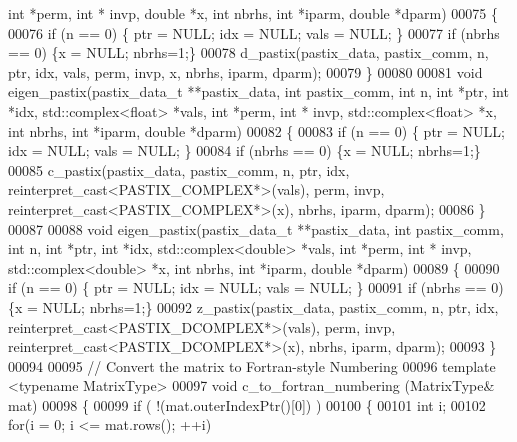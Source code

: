 \begin{DoxyCode}
{      int} *perm, \textcolor{keywordtype}{int} * invp, \textcolor{keywordtype}{double} *x, \textcolor{keywordtype}{int} nbrhs, \textcolor{keywordtype}{int} *iparm, \textcolor{keywordtype}{double} *dparm)
00075   \{
00076     \textcolor{keywordflow}{if} (n == 0) \{ ptr = NULL; idx = NULL; vals = NULL; \}
00077     \textcolor{keywordflow}{if} (nbrhs == 0) \{x = NULL; nbrhs=1;\}
00078     d\_pastix(pastix\_data, pastix\_comm, n, ptr, idx, vals, perm, invp, x, nbrhs, iparm, dparm); 
00079   \}
00080   
00081   \textcolor{keywordtype}{void} eigen\_pastix(pastix\_data\_t **pastix\_data, \textcolor{keywordtype}{int} pastix\_comm, \textcolor{keywordtype}{int} n, \textcolor{keywordtype}{int} *ptr, \textcolor{keywordtype}{int} *idx, 
      std::complex<float> *vals, \textcolor{keywordtype}{int} *perm, \textcolor{keywordtype}{int} * invp, std::complex<float> *x, \textcolor{keywordtype}{int} nbrhs, \textcolor{keywordtype}{int} *iparm, \textcolor{keywordtype}{double} *dparm)
00082   \{
00083     \textcolor{keywordflow}{if} (n == 0) \{ ptr = NULL; idx = NULL; vals = NULL; \}
00084     \textcolor{keywordflow}{if} (nbrhs == 0) \{x = NULL; nbrhs=1;\}
00085     c\_pastix(pastix\_data, pastix\_comm, n, ptr, idx, reinterpret\_cast<PASTIX\_COMPLEX*>(vals), perm, invp, 
      reinterpret\_cast<PASTIX\_COMPLEX*>(x), nbrhs, iparm, dparm); 
00086   \}
00087   
00088   \textcolor{keywordtype}{void} eigen\_pastix(pastix\_data\_t **pastix\_data, \textcolor{keywordtype}{int} pastix\_comm, \textcolor{keywordtype}{int} n, \textcolor{keywordtype}{int} *ptr, \textcolor{keywordtype}{int} *idx, 
      std::complex<double> *vals, \textcolor{keywordtype}{int} *perm, \textcolor{keywordtype}{int} * invp, std::complex<double> *x, \textcolor{keywordtype}{int} nbrhs, \textcolor{keywordtype}{int} *iparm, \textcolor{keywordtype}{double} *dparm)
00089   \{
00090     \textcolor{keywordflow}{if} (n == 0) \{ ptr = NULL; idx = NULL; vals = NULL; \}
00091     \textcolor{keywordflow}{if} (nbrhs == 0) \{x = NULL; nbrhs=1;\}
00092     z\_pastix(pastix\_data, pastix\_comm, n, ptr, idx, reinterpret\_cast<PASTIX\_DCOMPLEX*>(vals), perm, invp, 
      reinterpret\_cast<PASTIX\_DCOMPLEX*>(x), nbrhs, iparm, dparm); 
00093   \}
00094 
00095   \textcolor{comment}{// Convert the matrix  to Fortran-style Numbering}
00096   \textcolor{keyword}{template} <\textcolor{keyword}{typename} MatrixType>
00097   \textcolor{keywordtype}{void} c\_to\_fortran\_numbering (MatrixType& mat)
00098   \{
00099     \textcolor{keywordflow}{if} ( !(mat.outerIndexPtr()[0]) ) 
00100     \{ 
00101       \textcolor{keywordtype}{int} i;
00102       \textcolor{keywordflow}{for}(i = 0; i <= mat.rows(); ++i)

\end{DoxyCode}
